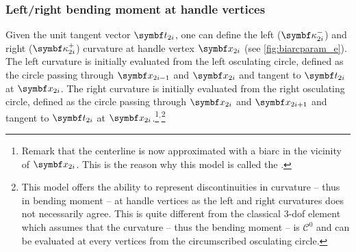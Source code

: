{{		
	}
}

\subsubsection{Left/right bending moment at handle vertices}
Given the unit tangent vector $\vect{t}_{2i}$, one can define the left ($\vect{\kappa}_{2i}^-$) and right ($\vect{\kappa}_{2i}^+$) curvature at handle vertex $\vect{x}_{2i}$ (see \cref{fig:biarcparam_e}). The left curvature is initially evaluated from the left osculating circle, defined as the circle passing through $\vect{x}_{2i-1}$ and $\vect{x}_{2i}$ and tangent to $\vect{t}_{2i}$ at $\vect{x}_{2i}$. The right curvature is initially evaluated from the right osculating circle, defined as the circle passing through $\vect{x}_{2i}$ and $\vect{x}_{2i+1}$ and tangent to $\vect{t}_{2i}$ at $\vect{x}_{2i}$.\footnote{Remark that the centerline is now approximated with a biarc in the vicinity of $\vect{x}_{2i}$. This is the reason why this model is called the .}${}^,$\footnote{This model offers the ability to represent discontinuities in curvature -- thus in bending moment -- at handle vertices as the left and right curvatures does not necessarily agree. This is quite different from the classical 3-dof element~\cite{Barnes1999, Adriaenssens1999, Douthe2006} which assumes that the curvature -- thus the bending moment -- is $\mathcal{C}^0$ and can be evaluated at every vertices from the circumscribed osculating circle.}

